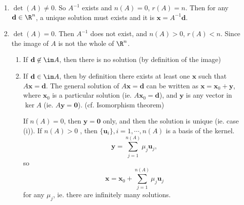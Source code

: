 \documentclass[a4paper]{article}
\begin{document}
\begin{enumerate}
  \item $\det(A) \not= 0$. So $A^{-1}$ exists and $n(A) = 0$, $r(A) = n$. Then for any $\mathbf{d}\in \R^n$, a unique solution must exists and it is $\mathbf{x} = A^{-1}\mathbf{d}$.
  \item $\det(A) = 0$. Then $A^{-1}$ does not exist, and $n(A) > 0$, $r(A) < n$. Since the image of $A$ is not the whole of $\R^n$.
    \begin{enumerate}
      \item If $\mathbf{d}\not\in \im A$, then there is no solution (by definition of the image)
      \item If $\mathbf{d}\in \im A$, then by definition there exists at least one $\mathbf{x}$ such that $A\mathbf{x} = \mathbf{d}$. The general solution of $A\mathbf{x} = \mathbf{d}$  can be written as $\mathbf{x} = \mathbf{x}_0 + \mathbf{y}$, where $\mathbf{x}_0$ is a particular solution (ie. $A\mathbf{x}_0 = \mathbf{d}$), and $\mathbf{y}$ is any vector in $\ker A$ (ie. $A\mathbf{y} = \mathbf{0}$). (cf. Isomorphism theorem)

        If $n(A) = 0$, then $\mathbf{y = 0}$ only, and then the solution is unique (ie. case (i)). If $n(A) > 0$ , then $\{\mathbf{u}_i\}, i = 1, \cdots, n(A)$ is a basis of the kernel.
        \[
          \mathbf{y} = \sum_{j = 1}^{n(A)} \mu_j \mathbf{u}_j,
        \]
        so
        \[
          \mathbf{x} = \mathbf{x}_0 + \sum_{j = 1}^{n(A)} \mu_j \mathbf{u}_j
        \]
        for any $\mu_j$, ie. there are infinitely many solutions.
    \end{enumerate}
\end{enumerate}
\end{document}

